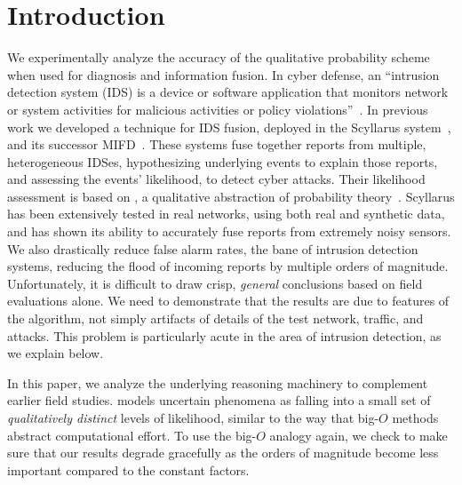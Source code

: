 \section{Introduction}
\label{sec:introduction}

We experimentally analyze the accuracy of the \zplus qualitative
probability scheme when used for diagnosis and information fusion.
In cyber defense, an ``intrusion detection system (IDS) is a device or
software application that monitors network or system activities for malicious
activities or policy violations''~\cite{wiki:ids}.
In previous work we developed a technique for IDS
fusion, deployed in the Scyllarus system~, and its
successor MIFD~.
These systems fuse together reports from multiple, heterogeneous IDSes,
hypothesizing underlying events to explain those reports, and assessing the events'
likelihood, to detect cyber attacks.
Their likelihood assessment is based on \zplus, a qualitative
abstraction of probability theory~\cite{Goldszmidt:96}.
Scyllarus has been extensively tested in real networks, using both
real and synthetic data, and has shown its ability to accurately fuse reports
from extremely noisy sensors. 
We also
drastically reduce false alarm rates, the bane of intrusion
detection systems, reducing the flood of incoming reports by multiple
orders of magnitude.
Unfortunately, it is difficult to draw crisp, \emph{general} conclusions based on
field evaluations alone.
We need to demonstrate that the results are due to features of the algorithm,
not simply artifacts of details of the test network, traffic, and
attacks.  This problem is particularly acute in the area of intrusion detection,
as we explain below.
%

In this paper, we analyze the underlying reasoning machinery to
complement earlier field studies.
%
\zplus models uncertain phenomena as falling into a small set of
\emph{qualitatively distinct} levels of likelihood, similar to the way that
big-$O$ methods abstract computational effort.
To use the big-$O$ analogy again, we check to make sure that our results degrade
gracefully as the orders of magnitude become less important compared to the
constant factors.

